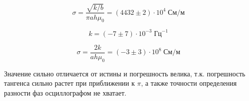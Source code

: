 \[
    \sigma = \frac{\sqrt{k/b}}{\pi ah \mu_0} = \left(4432 \pm 2\right)\cdot 10^{4}\;\text{См} / \text{м}
\]
\begin{figure}[ht!]
\end{figure}
\begin{figure}[ht!]
\end{figure}

\[
    k = \left(-7 \pm 7\right)\cdot 10^{-3}\;\text{Гц}^{-1}
\]

\[
    \sigma = \frac{2k}{ah\mu_0} = \left(-3 \pm 3\right)\cdot 10^{8}\;\text{См} / \text{м}
\]

Значение сильно отличается от истины и погрешность велика, т.к. погрешность тангенса сильно растет при приближении к $\pi$, а также
точности определения разности фаз осциллографом не хватает.

